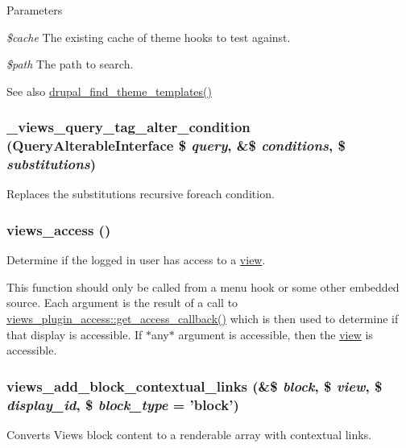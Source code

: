 \begin{DoxyParams}{Parameters}
\item[{\em \$cache}]The existing cache of theme hooks to test against. \item[{\em \$path}]The path to search.\end{DoxyParams}
\begin{DoxySeeAlso}{See also}
\hyperlink{includes_2theme_8inc_aa755f6e8f11a62c9e90a6d7af55145b1}{drupal\_\-find\_\-theme\_\-templates()} 
\end{DoxySeeAlso}
\hypertarget{views_8module_a51cb108c148c7478b50e6262e216a17d}{
\subsubsection[{\_\-views\_\-query\_\-tag\_\-alter\_\-condition}]{\setlength{\rightskip}{0pt plus 5cm}\_\-views\_\-query\_\-tag\_\-alter\_\-condition ({\bf QueryAlterableInterface} \$ {\em query}, \/  \&\$ {\em conditions}, \/  \$ {\em substitutions})}}
\label{views_8module_a51cb108c148c7478b50e6262e216a17d}
Replaces the substitutions recursive foreach condition. \hypertarget{views_8module_a3ecb735baf489bc115f6de9549d8fe81}{
\subsubsection[{views\_\-access}]{\setlength{\rightskip}{0pt plus 5cm}views\_\-access ()}}
\label{views_8module_a3ecb735baf489bc115f6de9549d8fe81}
Determine if the logged in user has access to a \hyperlink{classview}{view}.

This function should only be called from a menu hook or some other embedded source. Each argument is the result of a call to \hyperlink{classviews__plugin__access_ad4038a32fccc6a662a74f437d0bf6a23}{views\_\-plugin\_\-access::get\_\-access\_\-callback()} which is then used to determine if that display is accessible. If $\ast$any$\ast$ argument is accessible, then the \hyperlink{classview}{view} is accessible. \hypertarget{views_8module_a45becd00bbd9f1fa7e672af1513200d5}{
\subsubsection[{views\_\-add\_\-block\_\-contextual\_\-links}]{\setlength{\rightskip}{0pt plus 5cm}views\_\-add\_\-block\_\-contextual\_\-links (\&\$ {\em block}, \/  \$ {\em view}, \/  \$ {\em display\_\-id}, \/  \$ {\em block\_\-type} = {\ttfamily 'block'})}}
\label{views_8module_a45becd00bbd9f1fa7e672af1513200d5}
Converts Views block content to a renderable array with contextual links.


